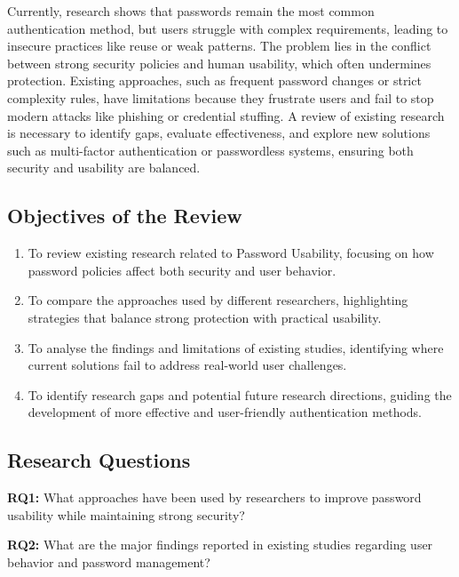 \documentclass[12pt,a4paper]{article}
\begin{document}
\begin{justify}
Currently, research shows that passwords remain the most common authentication method, but users struggle with complex requirements, leading to insecure practices like reuse or weak patterns. 
The problem lies in the conflict between strong security policies and human usability, which often undermines protection. 
Existing approaches, such as frequent password changes or strict complexity rules, have limitations because they frustrate users and fail to stop modern attacks like phishing or credential stuffing. 
A review of existing research is necessary to identify gaps, evaluate effectiveness, and explore new solutions such as multi-factor authentication or passwordless systems, ensuring both security and usability are balanced.


\subsection{Objectives of the Review}

\begin{enumerate}

    \item To review existing research related to Password Usability, focusing on how password policies affect both security and user behavior.  
    \item To compare the approaches used by different researchers, highlighting strategies that balance strong protection with practical usability.  
    \item To analyse the findings and limitations of existing studies, identifying where current solutions fail to address real-world user challenges.  
    \item To identify research gaps and potential future research directions, guiding the development of more effective and user-friendly authentication methods.

\end{enumerate}


\subsection{Research Questions}

\textbf{RQ1:} What approaches have been used by researchers to improve password usability while maintaining strong security?

\vspace{0.2cm}

\textbf{RQ2:} What are the major findings reported in existing studies regarding user behavior and password management?  


\end{justify}
\end{document}
